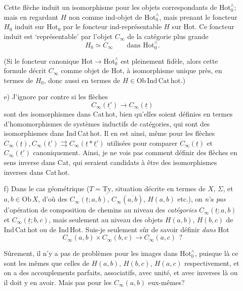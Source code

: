 \documentclass[11pt]{article}
\newcommand{\printedpage}[1]{\marginpar{\footnotesize p.~#1}}
\newcommand{\msp}[1]{\marginpar{\footnotesize [#1]}}
\newcommand{\Hot}{\mathrm{Hot}}
\newcommand{\Hotz}{\mathrm{Hot}_0^{\wedge}}
\begin{document}
\begin{enumerate}
Cette flèche induit un isomorphisme pour les objets correspondants de $\Hotz$; mais en regardant $H$ non comme ind-objet de $\Hotz$, mais prenant le foncteur $H_0$ induit sur $\Hot_0$ par le foncteur ind-représentable $H$ sur Hot. Ce foncteur induit est ‘représentable’ par l'objet $C_\infty$ de la catégorie plus grande
\[
H_0 \simeq C_\infty \qquad \text{dans } \Hotz.
\]

(Si le foncteur canonique $\Hot \longrightarrow \Hotz$ est pleinement fidèle, alors cette formule décrit $C_\infty$ comme objet de Hot, à isomorphisme unique près, en termes de $H_0$, donc aussi en termes de $H \in \mathrm{Ob\,Ind\,Cat\,hot}$.)

\printedpage{78}
\msp{page 124}
\item[e)] J'ignore par contre si les flèches
\[
C_\infty(\underline{t'}) \longrightarrow C_\infty(\underline{t})
\]
sont des isomorphismes dans Cat\,hot, bien qu'elles soient définies en termes d'homomorphismes de systèmes inductifs de catégories, qui sont des isomorphismes dans Ind\,Cat\,hot. Il en est ainsi, même pour les flèches $C_\infty(\underline{t}), C_\infty(\underline{t'}) \rightrightarrows C_\infty(\underline{t} * \underline{t'})$ utilisées pour comparer $C_\infty(\underline{t})$ et $C_\infty(\underline{t'})$ canoniquement. Ainsi, je ne vois pas comment définir des flèches en sens inverse dans Cat, qui seraient candidats à être des isomorphismes inverses dans Cat\,hot.

\item[f)] Dans le cas géométrique ($T = \underline{\mathrm{Ty}}$, situation décrite en termes de $X$, $\Sigma$, et $a, b \in \mathrm{Ob}\,X$, d'où des $C_\infty(\underline{t}; a, b)$, $C_\infty(\overline{a, b})$, $H(a,b)$ etc.), on \textit{n'a pas} d'opération de composition de chemins au niveau des \textit{catégories} $C_\infty(\underline{t}; a, b)$ et $C_\infty(\underline{t}; b, c)$, mais seulement au niveau des objets $H(a,b)$, $H(b,c)$ de Ind\,Cat\,hot ou de Ind\,Hot. Suis-je seulement sûr de savoir définir \textit{dans} Hot
\[
C_\infty(a,b) \times C_\infty(b,c) \longrightarrow C_\infty(a,c) \ \ ?
\]

Sûrement, il n'y a pas de problèmes pour les images dans $\Hotz$, puisque là ce sont les mêmes que celles de $H(a,b)$, $H(b,c)$, $H(a,c)$ respectivement, et on a des accouplements parfaits, associatifs, avec unité, et avec inverses là ou il doit y %
\msp{page 125}
en avoir. Mais pas pour les $C_\infty(a,b)$ eux-mêmes?
\end{enumerate}
\end{document}
